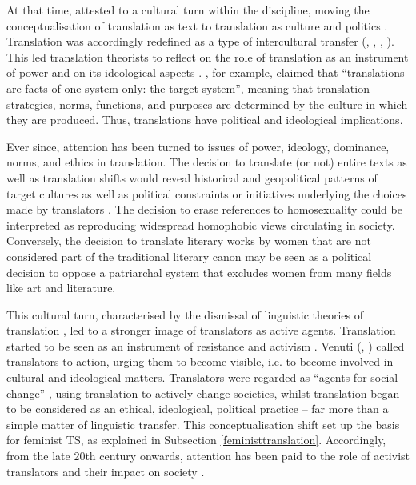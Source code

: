 At that time, \textcite{snell1990linguistic} attested to a cultural turn within the discipline, moving the conceptualisation of translation as text to translation as culture and politics \citep[198]{munday2022introducing}. Translation was accordingly redefined as a type of intercultural transfer (\cite{bassnett1990translation}, \cite{venuti2018rethinking}, \cite*{venuti1995translator}, \cite[5]{tymoczko2010translation}). This led translation theorists to reflect on the role of translation as an instrument of power and on its ideological aspects \citep[3--4]{tymoczko2010translation}. \textcite[25]{toury1982rationale}, for example, claimed that ``translations are facts of one system only: the target system'', meaning that translation strategies, norms, functions, and purposes are determined by the culture in which they are produced. Thus, translations have political and ideological implications. 

Ever since, attention has been turned to issues of power, ideology, dominance, norms, and ethics in translation. The decision to translate (or not) entire texts as well as translation shifts would reveal historical and geopolitical patterns of target cultures as well as political constraints or initiatives underlying the choices made by translators \citep[6--7]{tymoczko2010translation}. The decision to erase references to homosexuality could be interpreted as reproducing widespread homophobic views circulating in society. Conversely, the decision to translate literary works by women that are not considered part of the traditional literary canon may be seen as a political decision to oppose a patriarchal system that excludes women from many fields like art and literature. 

This cultural turn, characterised by the dismissal of linguistic theories of translation \citep{bassnett1990translation}, led to a stronger image of translators as active agents. Translation started to be seen as an instrument of resistance and activism \citep[7]{tymoczko2010translation}. Venuti (\cite*{venuti2018rethinking}, \cite*{venuti1995translator}) called translators to action, urging them to become visible, i.e. to become involved in cultural and ideological matters. Translators were regarded as ``agents for social change'' \citep[3]{tymoczko2010translation}, using translation to actively change societies, whilst translation began to be considered as an ethical, ideological, political practice -- far more than a simple matter of linguistic transfer. This conceptualisation shift set up the basis for feminist TS, as explained in Subsection \ref{feministtranslation}. Accordingly, from the late 20th century onwards, attention has been paid to the role of activist translators and their impact on society \citep{tymoczko2002introduction,tymoczko2010translation}. 

